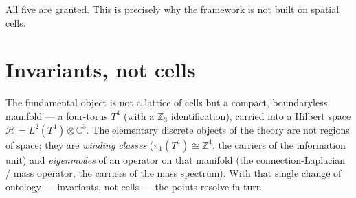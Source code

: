 All five are granted. This is precisely why the framework is not built on spatial
cells.

\section{Invariants, not cells}

The fundamental object is not a lattice of cells but a compact, boundaryless manifold
--- a four-torus $T^4$ (with a $\mathbb{Z}_3$ identification), carried into a Hilbert
space $\mathcal{H}=L^2(T^4)\otimes\mathbb{C}^3$. The elementary discrete objects of
the theory are not regions of space; they are \emph{winding classes}
($\pi_1(T^4)\cong\mathbb{Z}^4$, the carriers of the information unit) and
\emph{eigenmodes} of an operator on that manifold (the connection-Laplacian / mass
operator, the carriers of the mass spectrum). With that single change of ontology ---
invariants, not cells --- the points resolve in turn.


